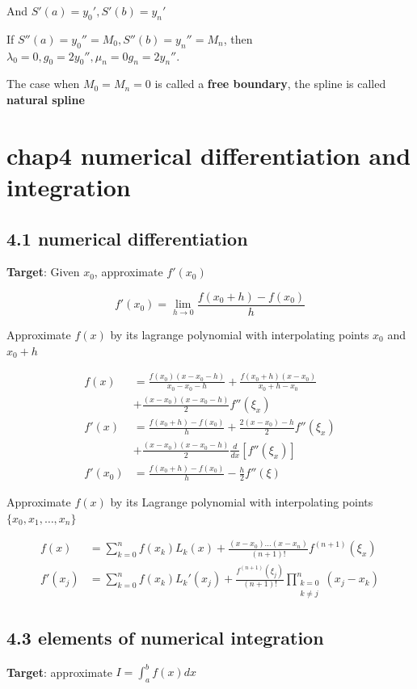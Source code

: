 \documentclass[11pt]{article}
\begin{document}
And  \(S'(a)=y_0',S'(b)=y_n'\)

If \(S''(a)=y_0''=M_0,S''(b)=y_n''=M_n\), then \(\lambda_0=0,g_0=2y_0'',\mu_n=0
   g_n=2y_n''\).

The case when \(M_0=M_n=0\) is called a \textbf{free boundary}, the spline is called
\textbf{natural spline}
\section{chap4 numerical differentiation and integration}
\label{sec:org3e52a65}
\subsection{4.1 numerical differentiation}
\label{sec:org1668409}
\textbf{Target}: Given \(x_0\), approximate \(f'(x_0)\)

\begin{equation*}
f'(x_0)=\lim\limits_{h\to0}\frac{f(x_0+h)-f(x_0)}{h}
\end{equation*}

Approximate \(f(x)\) by its lagrange polynomial with interpolating points \(x_0\)
and \(x_0+h\)

\begin{align*}
f(x)&=\frac{f(x_0)(x-x_0-h)}{x_0-x_0-h}+\frac{f(x_0+h)(x-x_0)}{x_0+h-x_0}\\
&+\frac{(x-x_0)(x-x_0-h)}{2}f''(\xi_x)\\
f'(x)&=\frac{f(x_0+h)-f(x_0)}{h}+\frac{2(x-x_0)-h}{2}f''(\xi_x)\\
&+\frac{(x-x_0)(x-x_0-h)}{2}\frac{d}{dx}[f''(\xi_x)]\\
f'(x_0)&=\frac{f(x_0+h)-f(x_0)}{h}-\frac{h}{2}f''(\xi)
\end{align*}

Approximate \(f(x)\) by its Lagrange polynomial with interpolating points
\(\{x_0,x_1,\dots,x_n\}\)

\begin{align*}
f(x)&=\displaystyle\sum_{k=0}^nf(x_k)L_k(x)+\frac{(x-x_0)\dots(x-x_n)}{(n+1)!}
f^{(n+1)}(\xi_x)\\
f'(x_j)&=\displaystyle\sum_{k=0}^nf(x_k)L_k'(x_j)+\frac{f^{(n+1)}(\xi_j)}{(n+1)!}
\displaystyle\prod_{\substack{k=0\\k\neq j}}^n(x_j-x_k)
\end{align*}
\subsection{4.3 elements of numerical integration}
\label{sec:orgcce5a1d}
\textbf{Target}: approximate \(I=\int_a^bf(x)dx\)
\end{document}
